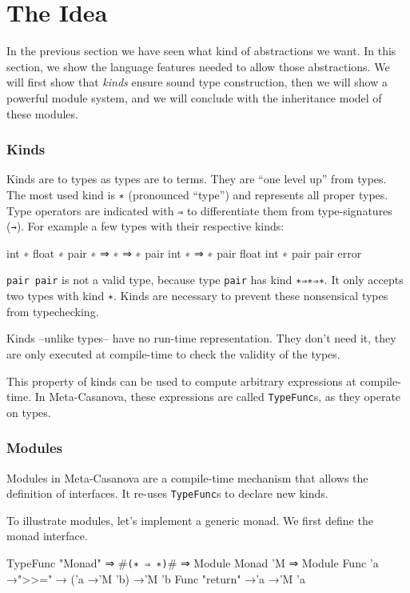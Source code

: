 \section{The Idea}
In the previous section we have seen what kind of abstractions we want.
In this section, we show the language features needed to allow those abstractions.
We will first show that \textit{kinds} ensure sound type construction,
then we will show a powerful module system,
and we will conclude with the inheritance model of these modules.

\subsubsection*{Kinds}
Kinds are to types as types are to terms.\cite[Chapter~30]{Pierce02}
They are ``one level up'' from types.
The most used kind is \texttt{∗} (pronounced ``type'') and represents all proper types.
Type operators are indicated with \texttt{⇒} to differentiate them from type-signatures (\texttt{→}).
For example a few types with their respective kinds:
\begin{code}
  int             ∗
  float           ∗
  pair            ∗ ⇒ ∗ ⇒ ∗
  pair int        ∗ ⇒ ∗ 
  pair float int  ∗
  pair pair       error
\end{code}

\texttt{pair pair} is not a valid type, because type \texttt{pair} has kind \texttt{∗⇒∗⇒∗}.
It only accepts two types with kind \texttt{∗}.
Kinds are necessary to prevent these nonsensical types from typechecking.

Kinds --unlike types-- have no run-time representation.
They don't need it, they are only executed at compile-time to check the validity of the types.

This property of kinds can be used to compute arbitrary expressions at compile-time.
In Meta-Casanova, these expressions are called \texttt{TypeFunc}s, as they operate on types.

\subsubsection*{Modules}
Modules in Meta-Casanova are a compile-time mechanism that allows the definition of interfaces.
It re-uses \texttt{TypeFunc}s to declare new kinds.

To illustrate modules, let's implement a generic monad.
We first define the monad interface.

\begin{code}
  TypeFunc "Monad" ⇒ #\verb|(∗ ⇒ ∗)|# ⇒ Module
  Monad 'M ⇒ Module {
    Func 'a →">>=" → ('a →'M 'b) →'M 'b
    Func "return" →'a →'M 'a
  }
\end{code}

